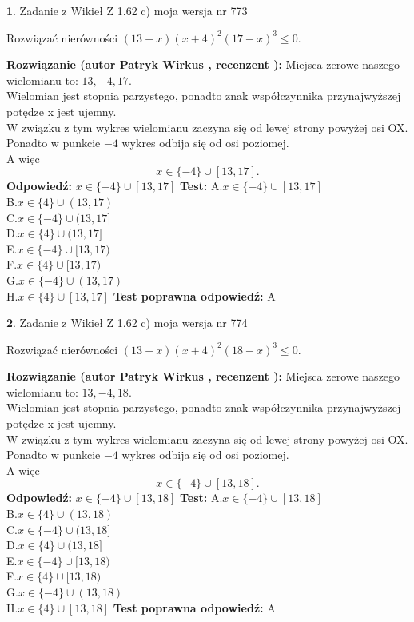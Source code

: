 \documentclass[12pt, a4paper]{article}
\theoremstyle{definition} %
\newtheorem{zad}{}
\newcommand{\zadStart}[1]{\begin{zad}#1\newline}
\newcommand{\zadStop}{\end{zad}}
\newcommand{\rozwStart}[2]{\noindent \textbf{Rozwiązanie (autor #1 , recenzent #2): }\newline}
\newcommand{\rozwStop}{\newline}
\newcommand{\odpStart}{\noindent \textbf{Odpowiedź:}\newline}
\newcommand{\odpStop}{\newline}
\newcommand{\testStart}{\noindent \textbf{Test:}\newline}
\newcommand{\testStop}{\newline}
\newcommand{\kluczStart}{\noindent \textbf{Test poprawna odpowiedź:}\newline}
\newcommand{\kluczStop}{\newline}
\begin{document}
\zadStart{Zadanie z Wikieł Z 1.62 c) moja wersja nr 773}

Rozwiązać nierówności $(13-x)(x+4)^{2}(17-x)^{3}\le0$.
\zadStop
\rozwStart{Patryk Wirkus}{}
Miejsca zerowe naszego wielomianu to: $13, -4, 17$.\\
Wielomian jest stopnia parzystego, ponadto znak współczynnika przy\linebreak najwyższej potędze x jest ujemny.\\ W związku z tym wykres wielomianu zaczyna się od lewej strony powyżej osi OX.\\
Ponadto w punkcie $-4$ wykres odbija się od osi poziomej.\\
A więc $$x \in \{-4\} \cup [13,17].$$
\rozwStop
\odpStart
$x \in \{-4\} \cup [13,17]$
\odpStop
\testStart
A.$x \in \{-4\} \cup [13,17]$\\
B.$x \in \{4\} \cup (13,17)$\\
C.$x \in \{-4\} \cup (13,17]$\\
D.$x \in \{4\} \cup (13,17]$\\
E.$x \in \{-4\} \cup [13,17)$\\
F.$x \in \{4\} \cup [13,17)$\\
G.$x \in \{-4\} \cup (13,17)$\\
H.$x \in \{4\} \cup [13,17]$
\testStop
\kluczStart
A
\kluczStop



\zadStart{Zadanie z Wikieł Z 1.62 c) moja wersja nr 774}

Rozwiązać nierówności $(13-x)(x+4)^{2}(18-x)^{3}\le0$.
\zadStop
\rozwStart{Patryk Wirkus}{}
Miejsca zerowe naszego wielomianu to: $13, -4, 18$.\\
Wielomian jest stopnia parzystego, ponadto znak współczynnika przy\linebreak najwyższej potędze x jest ujemny.\\ W związku z tym wykres wielomianu zaczyna się od lewej strony powyżej osi OX.\\
Ponadto w punkcie $-4$ wykres odbija się od osi poziomej.\\
A więc $$x \in \{-4\} \cup [13,18].$$
\rozwStop
\odpStart
$x \in \{-4\} \cup [13,18]$
\odpStop
\testStart
A.$x \in \{-4\} \cup [13,18]$\\
B.$x \in \{4\} \cup (13,18)$\\
C.$x \in \{-4\} \cup (13,18]$\\
D.$x \in \{4\} \cup (13,18]$\\
E.$x \in \{-4\} \cup [13,18)$\\
F.$x \in \{4\} \cup [13,18)$\\
G.$x \in \{-4\} \cup (13,18)$\\
H.$x \in \{4\} \cup [13,18]$
\testStop
\kluczStart
A
\kluczStop
\end{document}
